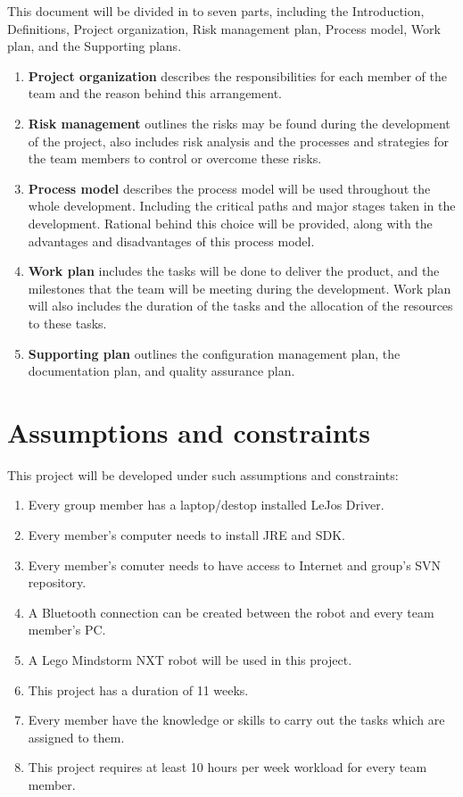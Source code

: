 \documentclass[11pt, a4paper]{report}
\begin{document}
This document will be divided in to seven parts, including the Introduction, Definitions, Project organization, Risk management plan, Process model, Work plan, and the Supporting plans.

\begin{enumerate}
	\item \textbf{Project organization} describes the responsibilities for each member of the team and the reason behind this arrangement.
	\item \textbf{Risk management} outlines the risks may be found during the development of the project, also includes risk analysis and the processes and strategies for the team members to control or overcome these risks.
	\item \textbf{Process model} describes the process model will be used throughout the whole development. Including the critical paths and major stages taken in the development. Rational behind this choice will be provided, along with the advantages and disadvantages of this process model. 
	\item \textbf{Work plan} includes the tasks will be done to deliver the product, and the milestones that the team will be meeting during the development. Work plan will also includes the duration of the tasks and the allocation of the resources to these tasks.
	\item \textbf{Supporting plan} outlines the configuration management plan, the documentation plan, and quality assurance plan.
\end{enumerate}


\section{Assumptions and constraints}
This project will be developed under such assumptions and constraints:
\begin{enumerate}
	\item Every group member has a laptop/destop installed LeJos Driver.
	\item Every member's computer needs to install JRE and SDK.
	\item Every member's comuter needs to have access to Internet and group's SVN repository.
	\item A Bluetooth connection can be created between the robot and every team member's PC.
	\item A Lego Mindstorm NXT robot will be used in this project. 
	\item This project has a duration of 11 weeks.
	\item Every member have the knowledge or skills to carry out the tasks which
are assigned to them.
	\item This project requires at least 10 hours per week workload for every team member.
\end{enumerate}
\end{document}
